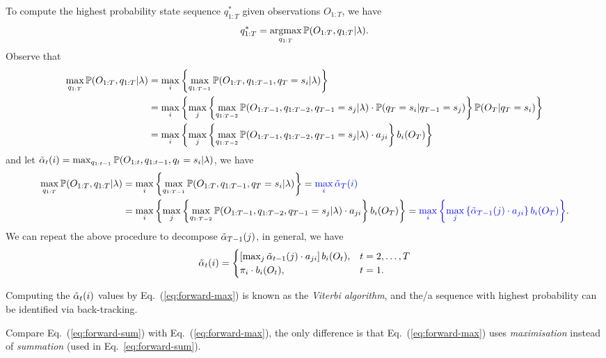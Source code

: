 To compute the highest probability state sequence $q_{1:T}^*$ given observations $O_{1:T}$, we have
\begin{equation*}
q_{1:T}^* = \operatorname*{argmax}_{q_{1:T}} \mathbb{P}(O_{1:T}, q_{1:T} |\lambda).
\end{equation*}
Observe that 
\begin{align*}
\max_{q_{1:T}} \mathbb{P}(O_{1:T}, q_{1:T} |\lambda) 
&= \max_{i} \left\{ \max_{q_{1:T-1}} \mathbb{P}(O_{1:T}, q_{1:T-1}, q_T = s_i |\lambda) \right\} \\
&= \max_{i} \left\{ \max_{j} \left\{ \max_{q_{1:T-2}} \mathbb{P}(O_{1:T-1}, q_{1:T-2}, q_{T-1} = s_j |\lambda) \cdot 
   \mathbb{P}(q_T = s_i |q_{T-1} = s_j) \right\} \mathbb{P}(O_T |q_T = s_i) \right\} \\
&= \max_{i} \left\{ \max_{j} \left\{ \max_{q_{1:T-2}} \mathbb{P}(O_{1:T-1}, q_{1:T-2}, q_{T-1} = s_j |\lambda) \cdot a_{ji} \right\} b_i(O_T) \right\}
\end{align*}
and let $\tilde{\alpha}_{t}(i) = \max_{q_{1:t-1}} \mathbb{P}(O_{1:t}, q_{1:t-1}, q_t = s_i |\lambda)$, we have
\begin{align*}
\max_{q_{1:T}} \mathbb{P}(O_{1:T}, q_{1:T} |\lambda) 
&= \max_{i} \left\{ \max_{q_{1:T-1}} \mathbb{P}(O_{1:T}, q_{1:T-1}, q_T = s_i |\lambda) \right\} 
 = {\color{blue}{\max_{i} \tilde{\alpha}_{T}(i)}} \\
&= \max_{i} \left\{ \max_{j} \left\{ \max_{q_{1:T-2}} \mathbb{P}(O_{1:T-1}, q_{1:T-2}, q_{T-1} = s_j |\lambda) \cdot a_{ji} \right\} b_i(O_T) \right\}
 = {\color{blue}{\max_{i} \left\{ \max_{j} \left\{ \tilde{\alpha}_{T-1}(j) \cdot a_{ji} \right\} b_i(O_T) \right\}}}.
\end{align*}
We can repeat the above procedure to decompose $\tilde{\alpha}_{T-1}(j)$, in general, we have
\begin{equation}
\label{eq:forward-max}
\tilde{\alpha}_t(i) = \begin{cases}
                \left[ \max_{j} \tilde{\alpha}_{t-1}(j) \cdot a_{ji} \right] b_i(O_t), & t=2,\dots,T \\
                \pi_i \cdot b_i(O_t), & t=1.
               \end{cases}
\end{equation}

Computing the $\tilde{\alpha}_t(i)$ values by Eq.~(\ref{eq:forward-max}) is known as the \emph{Viterbi algorithm}, 
and the/a sequence with highest probability can be identified via back-tracking.

Compare Eq.~(\ref{eq:forward-sum}) with Eq.~(\ref{eq:forward-max}), 
the only difference is that Eq.~(\ref{eq:forward-max}) uses \emph{maximisation} instead of \emph{summation} (used in Eq.~\ref{eq:forward-sum}).


